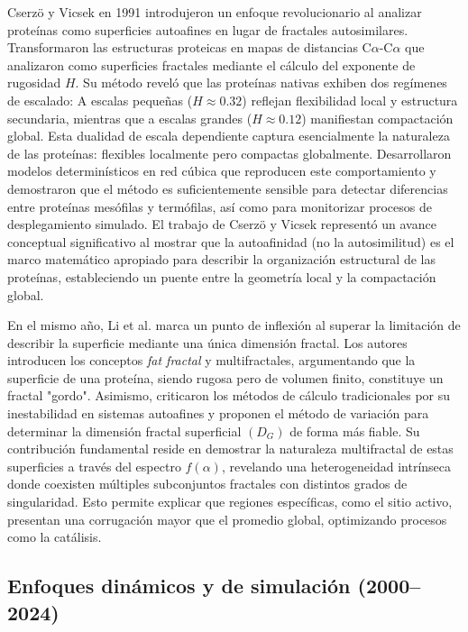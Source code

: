 Cserzö y Vicsek en 1991 \cite{Cserzo1991} introdujeron un enfoque revolucionario al analizar prote\'{i}nas como superficies autoafines en lugar de fractales autosimilares. Transformaron las estructuras proteicas en mapas de distancias C$\alpha$-C$\alpha$ que analizaron como superficies fractales mediante el c\'{a}lculo del exponente de rugosidad $H$. Su m\'{e}todo revel\'{o} que las prote\'{i}nas nativas exhiben dos reg\'{i}menes de escalado: A escalas pequeñas ($H \approx 0.32$) reflejan flexibilidad local y estructura secundaria, mientras que a escalas grandes ($H \approx 0.12$) manifiestan compactaci\'{o}n global. Esta dualidad de escala dependiente captura esencialmente la naturaleza de las prote\'{i}nas: flexibles localmente pero compactas globalmente. Desarrollaron modelos determin\'{i}sticos en red c\'{u}bica que reproducen este comportamiento y demostraron que el m\'{e}todo es suficientemente sensible para detectar diferencias entre prote\'{i}nas mes\'{o}filas y term\'{o}filas, as\'{i} como para monitorizar procesos de desplegamiento simulado. El trabajo de Cserzö y Vicsek represent\'{o} un avance conceptual significativo al mostrar que la autoafinidad (no la autosimilitud) es el marco matem\'{a}tico apropiado para describir la organizaci\'{o}n estructural de las prote\'{i}nas, estableciendo un puente entre la geometr\'{i}a local y la compactaci\'{o}n global.


En el mismo año, Li et al. \cite{HouqiangLi1991} marca un punto de inflexi\'{o}n al superar la limitaci\'{o}n de describir la superficie mediante una \'{u}nica dimensi\'{o}n fractal. Los autores introducen los conceptos \textit{fat fractal} y multifractales, argumentando que la superficie de una prote\'{i}na, siendo rugosa pero de volumen finito, constituye un fractal "gordo". Asimismo, criticaron los m\'{e}todos de c\'{a}lculo tradicionales por su inestabilidad en sistemas autoafines y proponen el m\'{e}todo de variaci\'{o}n para determinar la dimensi\'{o}n fractal superficial $(D_G)$ de forma m\'{a}s fiable. Su contribuci\'{o}n fundamental reside en demostrar la naturaleza multifractal de estas superficies a trav\'{e}s del espectro $f(\alpha)$, revelando una heterogeneidad intr\'{i}nseca donde coexisten m\'{u}ltiples subconjuntos fractales con distintos grados de singularidad. Esto permite explicar que regiones espec\'{i}ficas, como el sitio activo, presentan una corrugaci\'{o}n mayor que el promedio global, optimizando procesos como la cat\'{a}lisis. 

\subsection{Enfoques din\'{a}micos y de simulaci\'{o}n (2000--2024)}


